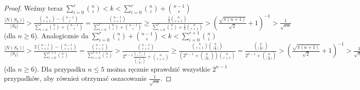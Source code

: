 \documentclass{pracamgr}
\begin{document}
\begin{proof}
    Weźmy teraz $\sum_{i=0}^{r}{n\choose i}<k<\sum_{i=0}^{r}{n\choose i}+{n-1 \choose r}$\newline
    $\frac{|N(S_k)|}{|S_k|}>\frac{{n\choose r+1}-{n-1\choose r}}{\sum_{i=0}^{r}{n\choose i}+{n-1 \choose r}}=
    \frac{{n-1\choose r+1}}{\sum_{i=0}^{r}{n\choose i}+{n-1 \choose r}}\ge
    \frac{\frac{1}{2}{n \choose r+1}}{\sum_{i=0}^{r}{n\choose i}+\frac{1}{2}{n \choose r+1}}>
    \left(\frac{\sqrt{\pi (n+1)}}{\sqrt{2}}+1\right)^{-1}>\frac{1}{\sqrt{\pi n}}$(dla $n\ge 6$).\newline
    Analogicznie da $\sum_{i=0}^{r}{n\choose i}+{n-1 \choose r}<k<\sum_{i=0}^{r+1}{n\choose i}$\newline
    $\frac{|N(S_k)|}{|S_k|}>\frac{2{n-1\choose r+1}-{n-1\choose r+1}}{\sum_{i=0}^{r+1}{n\choose i}}=
    \frac{{n-1\choose r+1}}{\sum_{i=0}^{r+1}{n\choose i}}>
    \frac{{n-1\choose r+1}}{2^{n-1}\frac{{n\choose r+1}}{{n\choose\lfloor\frac{n}{2}\rfloor}}+{n\choose r+1}}\ge
    \frac{{n\choose r+1}{n\choose\lfloor\frac{n}{2}\rfloor}}{(2^{n-1}+{n\choose\lfloor\frac{n}{2}\rfloor}){n\choose r+1}}=
    \frac{{n\choose\lfloor\frac{n}{2}\rfloor}}{2^{n-1}+{n\choose\lfloor\frac{n}{2}\rfloor}}>
    \left(\frac{\sqrt{\pi (n+1)}}{\sqrt{2}}+1\right)^{-1}>\frac{1}{\sqrt{\pi n}}$(dla $n\ge 6$).\newline
    Dla przypadku $n\le5$ można ręcznie sprawdzić wszystkie $2^{n-1}$ przypadków, aby również otrzymać oszacowanie $\frac{1}{\sqrt{\pi n}}$.
   \end{proof}


    
\end{document}
